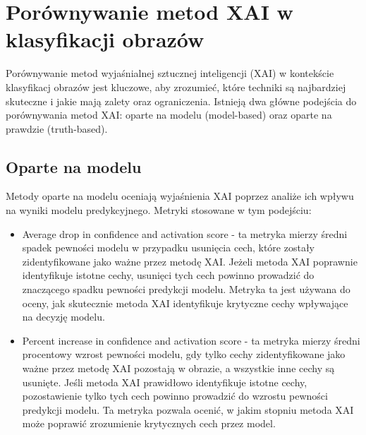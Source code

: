 \section*{Porównywanie metod XAI w klasyfikacji obrazów}
Porównywanie metod wyjaśnialnej sztucznej inteligencji (XAI) w kontekście klasyfikacj obrazów jest kluczowe, aby zrozumieć, które techniki są najbardziej skuteczne i jakie mają zalety oraz ograniczenia.
Istnieją dwa główne podejścia do porównywania metod XAI: oparte na modelu (model-based) oraz oparte na prawdzie (truth-based).

\subsection*{Oparte na modelu}
Metody oparte na modelu oceniają wyjaśnienia XAI poprzez analiże ich wpływu na wyniki modelu predykcyjnego.
Metryki stosowane w tym podejściu:
\begin{itemize}
	\item Average drop in confidence and activation score - ta metryka mierzy średni spadek pewności modelu w przypadku usunięcia cech, które zostały zidentyfikowane jako ważne przez metodę XAI.
	      Jeżeli metoda XAI poprawnie identyfikuje istotne cechy, usunięci tych cech powinno prowadzić do znaczącego spadku pewności predykcji modelu.
	      Metryka ta jest używana do oceny, jak skutecznie metoda XAI identyfikuje krytyczne cechy wpływające na decyzję modelu.
	\item Percent increase in confidence and activation score - ta metryka mierzy średni procentowy wzrost pewności modelu, gdy tylko cechy zidentyfikowane jako ważne przez metodę XAI pozostają w obrazie, a wszystkie inne cechy są usunięte.
	      Jeśli metoda XAI prawidłowo identyfikuje istotne cechy, pozostawienie tylko tych cech powinno prowadzić do wzrostu pewności predykcji modelu.
	      Ta metryka pozwala ocenić, w jakim stopniu metoda XAI może poprawić zrozumienie krytycznych cech przez model.
\end{itemize}


